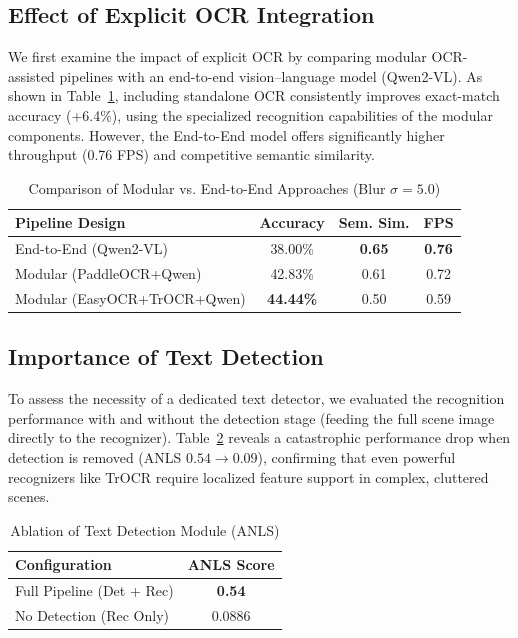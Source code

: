 \documentclass[conference]{IEEEtran}
\begin{document}
\subsection{Effect of Explicit OCR Integration}

We first examine the impact of explicit OCR by comparing modular OCR-assisted pipelines with an end-to-end vision--language model (Qwen2-VL). As shown in Table~\ref{tab:ablation_explicit}, including standalone OCR consistently improves exact-match accuracy (+6.4\%), using the specialized recognition capabilities of the modular components. However, the End-to-End model offers significantly higher throughput (0.76 FPS) and competitive semantic similarity.

\begin{table}[h]
\centering
\caption{Comparison of Modular vs. End-to-End Approaches (Blur $\sigma=5.0$)}
\label{tab:ablation_explicit}
\begin{tabular}{lccc}
\toprule
\textbf{Pipeline Design} & \textbf{Accuracy} & \textbf{Sem. Sim.} & \textbf{FPS} \\
\midrule
End-to-End (Qwen2-VL) & 38.00\% & \textbf{0.65} & \textbf{0.76} \\
Modular (PaddleOCR+Qwen) & 42.83\% & 0.61 & 0.72 \\
Modular (EasyOCR+TrOCR+Qwen) & \textbf{44.44\%} & 0.50 & 0.59 \\
\bottomrule
\end{tabular}
\end{table}

\subsection{Importance of Text Detection}

To assess the necessity of a dedicated text detector, we evaluated the recognition performance with and without the detection stage (feeding the full scene image directly to the recognizer).
Table~\ref{tab:ablation_detection} reveals a catastrophic performance drop when detection is removed (ANLS $0.54 \rightarrow 0.09$), confirming that even powerful recognizers like TrOCR require localized feature support in complex, cluttered scenes.

\begin{table}[h]
\centering
\caption{Ablation of Text Detection Module (ANLS)}
\label{tab:ablation_detection}
\begin{tabular}{lc}
\toprule
\textbf{Configuration} & \textbf{ANLS Score} \\
\midrule
Full Pipeline (Det + Rec) & \textbf{0.54}\\
No Detection (Rec Only) & 0.0886 \\
\bottomrule
\end{tabular}
\end{table}
\end{document}
